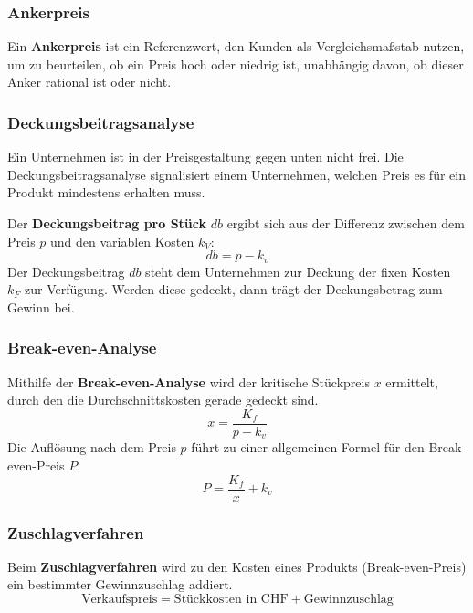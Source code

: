 \documentclass[12pt]{article}
\begin{document}
\subsubsection{Ankerpreis}
\begin{Definitionsbox}
    Ein \textbf{Ankerpreis} ist ein Referenzwert, den Kunden als Vergleichsmaßstab nutzen, um zu beurteilen, ob ein Preis hoch oder niedrig ist, unabhängig davon, ob dieser Anker rational ist oder nicht.
\end{Definitionsbox}

\subsubsection{Deckungsbeitragsanalyse}
Ein Unternehmen ist in der Preisgestaltung gegen unten nicht frei. Die Deckungsbeitragsanalyse signalisiert einem Unternehmen, welchen Preis es für ein Produkt mindestens erhalten muss.

Der \textbf{Deckungsbeitrag pro Stück} $db$ ergibt sich aus der Differenz zwischen dem Preis $p$ und den variablen Kosten $k_V$:
\begin{equation}
    db = p - k_v
\end{equation}
Der Deckungsbeitrag $db$ steht dem Unternehmen zur Deckung der fixen Kosten $k_F$ zur Verfügung. Werden diese gedeckt, dann trägt der Deckungsbetrag zum Gewinn bei.

\subsubsection{Break-even-Analyse}
Mithilfe der \textbf{Break-even-Analyse} wird der kritische Stückpreis $x$ ermittelt, durch den die Durchschnittskosten gerade gedeckt sind.
\begin{equation}
    x = \frac{K_f}{p - k_v}
\end{equation}
Die Auflösung nach dem Preis $p$ führt zu einer allgemeinen Formel für den Break-even-Preis $P$.
\begin{equation}
    P = \frac{K_f}{x} + k_v
\end{equation}

\subsubsection{Zuschlagverfahren}
Beim \textbf{Zuschlagverfahren} wird zu den Kosten eines Produkts (Break-even-Preis) ein bestimmter Gewinnzuschlag addiert.
\begin{equation}
    \text{Verkaufspreis} = \text{Stückkosten in CHF} + \text{Gewinnzuschlag}
\end{equation}
\end{document}
